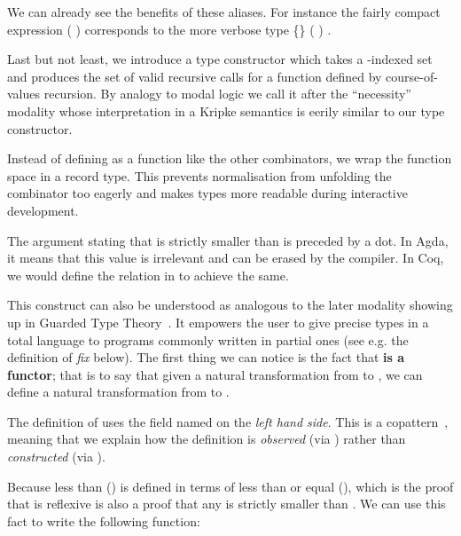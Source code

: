 We can already see the benefits of these aliases. For instance
the fairly compact expression \AF{[} (   )   \AF{]}
corresponds to the more verbose type
 \{\}  (   )   .


Last but not least, we introduce a type constructor which takes a
-indexed set and produces the set of valid recursive calls
for a function defined by course-of-values recursion. By analogy
to modal logic we call it \BOX{} after the ``necessity'' modality
whose interpretation in a Kripke semantics is eerily similar to
our type constructor.


 Instead of defining \BOX{} as a
function like the other combinators, we wrap the
function space in a record type. This prevents normalisation from
unfolding the combinator too eagerly and makes types more readable
during interactive development.

 The argument stating that  is strictly
smaller than  is preceded by a dot. In Agda, it means that
this value is irrelevant and can be erased by the compiler.
In Coq, we would define the relation \AF{\_<\_} in  to
achieve the same.
\medskip{}

This construct can also be understood as analogous to the later modality
showing up in Guarded Type Theory~\cite{vezzosi2015guarded}. It empowers
the user to give precise types in a total language to programs commonly
written in partial ones (see e.g. the definition of \textit{fix} below).
The first thing we can notice is the fact that \textbf{\BOX{} is a
functor}; that is to say that given a natural transformation from
 to , we can define a natural transformation from
\BOX{}  to \BOX{} .


 The definition of  uses
the \BOX{} field named  on the \emph{left hand side}.
This is a copattern~\cite{abel2013copatterns}, meaning that we
explain how the definition is \emph{observed} (via )
rather than \emph{constructed} (via ).
\medskip{}

Because less than (\AF{\_<\_}) is defined in terms of less than
or equal (),  which is the proof that 
is reflexive is also a proof that any  is strictly smaller than
 \AF{+} . We can use this fact to write the following
 function:

